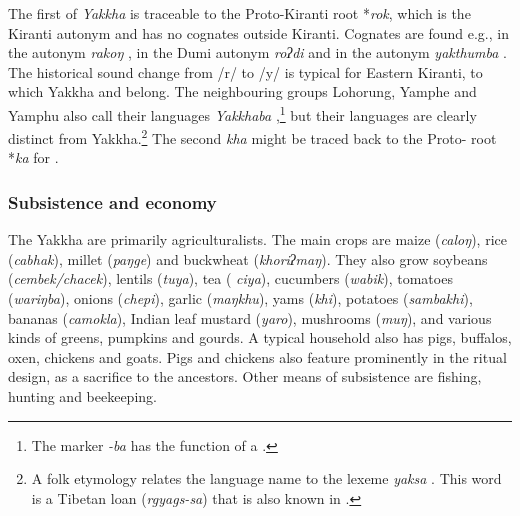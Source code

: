 The first  of  \emph{Yakkha} is traceable to the Proto-Kiranti root *\emph{rok}, which is the Kiranti autonym and has no cognates outside Kiranti. Cognates are found e.g., in the  autonym \emph{rakoŋ} \citep{Bickeletal2009Puma}, in the Dumi autonym \emph{roʔdi} \citep[413]{Driem1993A-grammar} and in the  autonym \emph{yakthumba} \citep[xix]{Driem1987A-grammar}.  The historical sound change from  /r/ to /y/ is typical for Eastern Kiranti, to which Yakkha and  belong. The neighbouring groups Lohorung, Yamphe and Yamphu  also call their languages \emph{Yakkhaba} \citep[347]{Driem1994The-Yakkha},\footnote{The marker \emph{-ba} has the function of a .}  but their languages are clearly distinct from Yakkha.\footnote{A folk etymology relates the language name to the  lexeme \emph{yaksa}  \citep[87]{Kongren2007Indigenous}. This word is a Tibetan loan (\emph{rgyags-sa})  that is also known in  \citep{Turner1931A-Comparative}.} The second  \emph{kha} might be traced back to the Proto- root  *\emph{ka} for  \citep[174]{Matisoff2003Handbook}.

   
\subsubsection{Subsistence and economy}
 
The Yakkha are primarily agriculturalists. The main crops are maize (\emph{caloŋ}), rice (\emph{cabhak}), millet (\emph{paŋge}) and  buckwheat (\emph{khoriʔmaŋ}). They also grow soybeans (\emph{cembek/chacek}), lentils (\emph{tuya}), tea ( \emph{ciya}), cucumbers (\emph{wabik}), tomatoes (\emph{wa\-riŋba}), onions (\emph{chepi}), garlic (\emph{maŋkhu}), yams (\emph{khi}), potatoes (\emph{sambakhi}), bananas (\emph{camokla}), Indian leaf mustard (\emph{yaro}), mushrooms (\emph{muŋ}), and various kinds of greens, pumpkins and gourds. A typical household also has pigs, buffalos, oxen, chickens and goats. Pigs and chickens also feature prominently in the ritual design, as a sacrifice to the ancestors. Other means of subsistence are fishing, hunting  and beekeeping.  

